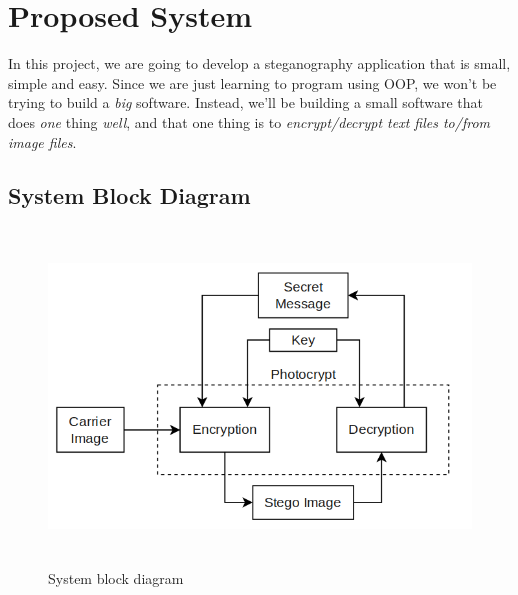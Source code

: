 \section{Proposed System}

In this project, we are going to develop a steganography application that is
small, simple and easy. Since we are just learning to program using OOP,
we won't be trying to build a \emph{big} software. Instead, we'll be building
a small software that does \emph{one} thing \emph{well}, and that one thing
is to \emph{encrypt/decrypt text files to/from image files}.


\subsection{System Block Diagram}

\begin{figure}[H]
    \centering
    \includegraphics[height=3.5in]{images/block-diagram.png}
    \caption{System block diagram}
\end{figure}
